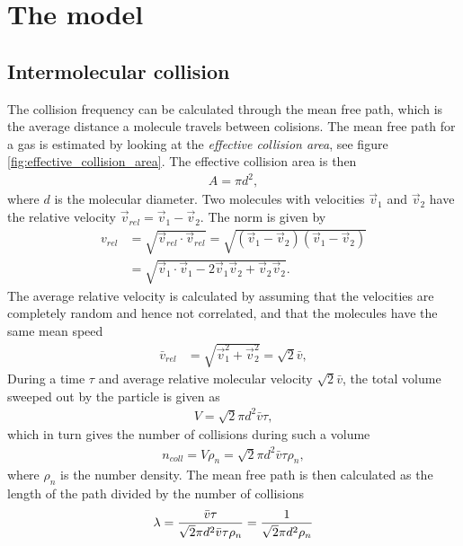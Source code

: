 \section{The model}
\subsection{Intermolecular collision}
The collision frequency can be calculated through the mean free path, which is the average distance a molecule travels between colisions. The mean free path for a gas is estimated by looking at the \textit{effective collision area}, see figure \ref{fig:effective_collision_area}. The effective collision area is then
\begin{align}
	A = \pi d^2,
\end{align}
where $d$ is the molecular diameter. Two molecules with velocities $\vec v_1$ and $\vec v_2$ have the relative velocity $\vec v_{rel} = \vec v_1 - \vec v_2$. The norm is given by
\begin{align}
	v_{rel} &= \sqrt{\vec v_{rel}\cdot \vec v_{rel} } = \sqrt{ (\vec v_1 - \vec v_2)(\vec v_1 - \vec v_2)}\\
	&= \sqrt{\vec v_1\cdot \vec v_1 - 2\vec v_1\vec v_2 + \vec v_2\vec v_2}.
\end{align}
The average relative velocity is calculated by assuming that the velocities are completely random and hence not correlated, and that the molecules have the same mean speed
\begin{align}
	\bar v_{rel} &= \sqrt{\vec v_1^2 + \vec v_2^2} = \sqrt 2 \bar v,
\end{align}
During a time $\tau$ and average relative molecular velocity $\sqrt 2 \bar v$, the total volume sweeped out by the particle is given as
\begin{align}
	V = \sqrt 2 \pi d^2\bar v \tau,
\end{align}
which in turn gives the number of collisions during such a volume
\begin{align}
	n_{coll} = V\rho_n = \sqrt 2 \pi d^2\bar v \tau \rho_n,
\end{align}
where $\rho_n$ is the number density. The mean free path is then calculated as the length of the path divided by the number of collisions
\begin{align}
	\lambda = {\bar v \tau\over \sqrt 2 \pi d^2\bar v \tau \rho_n} = {1 \over \sqrt 2 \pi d^2 \rho_n}
\end{align}
